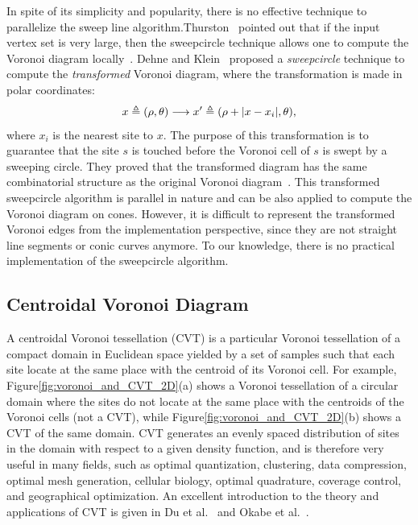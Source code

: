In spite of its simplicity and popularity, there is no effective technique to parallelize the sweep line algorithm.Thurston~\cite{Thurston:1986} pointed out that if the input vertex set is very large, then the sweepcircle technique allows one to compute the Voronoi diagram locally~\cite{Klein:1988:VDB:646504.696442}. Dehne and
Klein~\cite{Dehne_Klein:1987} proposed a {\em sweepcircle} technique to compute the \textit{transformed} Voronoi diagram, where the transformation is made in polar coordinates:
\begin{equation}\label{eq:transformation}
\vspace{-2mm}
    x\triangleq(\rho,\theta)\longrightarrow x'\triangleq(\rho+|x-x_i|,\theta),
    \vspace{-2mm}
\end{equation}
where $x_i$ is the nearest site to $x$. The purpose of this transformation is to guarantee that the site $s$ is touched before the Voronoi cell of $s$ is swept by a sweeping circle. They proved that the transformed diagram has the same combinatorial structure as the original Voronoi diagram~\cite{Dehne_Klein:1987}. This
transformed sweepcircle algorithm is parallel in nature and can be also applied to compute the Voronoi diagram on cones. However, it is difficult to represent the transformed Voronoi edges from the implementation perspective, since they are not straight line segments or conic curves anymore. To our knowledge, there is no
practical implementation of the sweepcircle algorithm.


\subsection{Centroidal Voronoi Diagram}
A centroidal Voronoi tessellation (CVT) is a particular
Voronoi tessellation of a compact domain in Euclidean space
yielded by a set of samples such that each site locate at the same place with the centroid of its Voronoi cell. For example, Figure\ref{fig:voronoi_and_CVT_2D}(a) shows
a Voronoi tessellation of a circular domain where the sites
do not locate at the same place with the centroids of the Voronoi cells (not a CVT),
 while Figure\ref{fig:voronoi_and_CVT_2D}(b) shows a CVT of the same domain. CVT generates
an evenly spaced distribution of sites in the domain with respect
to a given density function, and is therefore very useful in many
fields, such as optimal quantization, clustering, data compression,
optimal mesh generation, cellular biology, optimal quadrature, coverage
control, and geographical optimization. An excellent introduction
to the theory and applications of CVT is given in Du et al.~\cite{Du:1999:CVT}
 and Okabe et al.~\cite{Okabe:2000}.

